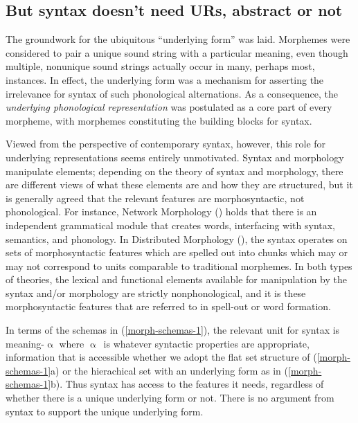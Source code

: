 \subsection{But syntax doesn't need URs, abstract or not}
 
The groundwork for the ubiquitous ``underlying form'' was laid. Morphemes were  considered to pair a unique sound string with a particular meaning, even though multiple, nonunique sound strings actually occur in many, perhaps most, instances. In effect, the underlying form was a mechanism for asserting the irrelevance for syntax of such phonological alternations. As a consequence, the {\it underlying phonological representation} was postulated as a core part of every morpheme, with morphemes constituting the building blocks for syntax. 

Viewed from the perspective of contemporary syntax, however, this role for underlying representations seems entirely unmotivated. Syntax and morphology manipulate elements; depending on the theory of syntax and morphology, there are different views of what these elements are and how they are structured, but it is generally agreed that the relevant features are morphosyntactic, not phonological.  For instance, Network Morphology (\citealt{Corbett+:1993, Brown+:1996, Fraser+:1997, Brown+:2012}) holds that there is an independent grammatical module that creates words, interfacing with syntax, semantics, and phonology. In Distributed Morphology (\citealt{Halle+:1993, Harley+:1999, Embick+:2007, Siddiqi:2009, Matushansky+:2013}), the syntax operates on sets of morphosyntactic features which are spelled out into chunks which may or may not correspond to units comparable to traditional morphemes. In both types of theories, the lexical and functional elements available for manipulation by the syntax and/or morphology are strictly nonphonological, and it is these morphosyntactic features that are referred to in spell-out or word formation. 
 
 In terms of the schemas in (\ref{morph-schemas-1}), the relevant unit for syntax is {\sc meaning-$\upalpha$} where $\upalpha$\ is whatever syntactic properties are appropriate, information that is accessible whether we adopt the flat set structure of (\ref{morph-schemas-1}a) or the hierachical set with an underlying form as in (\ref{morph-schemas-1}b). Thus syntax has access to the features it needs, regardless of whether there is a unique underlying form or not. There is no argument from syntax to support the unique underlying form.
  
